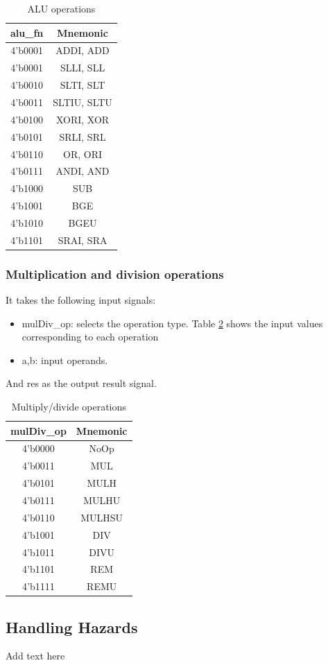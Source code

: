 \documentclass[../main.tex]{subfiles}
\begin{document}
\begin{table}[h!]
\begin{center}
\begin{tabular}{|c | c|}
    \hline
    alu\_fn & Mnemonic\\
    \hline
    4'b0001 & ADDI, ADD  \\ 
    \hline
	4'b0001 & SLLI, SLL  \\
	\hline
	4'b0010 & SLTI, SLT  \\
	\hline
	4'b0011 & SLTIU, SLTU \\
	\hline
	4'b0100 & XORI, XOR  \\
	\hline
	4'b0101 & SRLI, SRL  \\
	\hline
	4'b0110 & OR, ORI \\ 
	\hline
	4'b0111 & ANDI, AND \\
	\hline
	4'b1000 & SUB \\
	\hline
	4'b1001 & BGE\\  
	\hline
	4'b1010 & BGEU \\ 
	\hline
	4'b1101 & SRAI, SRA \\
	\hline
\end{tabular}
\end{center}
\caption{ALU operations}
\label{ch4.1}
\end{table}

\subsubsection{Multiplication and division operations}
It takes the following input signals:
\begin{itemize}
   \item  mulDiv\_op: selects the operation type. Table \ref{ch4.2} shows the input values corresponding to each operation
   \item a,b: input operands.
\end{itemize}

And res as the output result signal.

\begin{table}[h!]
\begin{center}
\begin{tabular}{|c | c|}
    \hline
    mulDiv\_op & Mnemonic\\
    \hline
    4'b0000 & NoOp  \\ 
    \hline
	4'b0011 & MUL  \\
	\hline
	4'b0101 & MULH  \\
	\hline
	4'b0111 & MULHU \\
	\hline
	4'b0110 & MULHSU  \\
	\hline
	4'b1001 & DIV  \\
	\hline
	4'b1011 & DIVU \\ 
	\hline
	4'b1101 & REM \\
	\hline
	4'b1111 & REMU \\
	\hline
\end{tabular}
\end{center}
\caption{Multiply/divide operations}
\label{ch4.2}
\end{table}

\subsection{Handling Hazards}
Add text here
\end{document}
